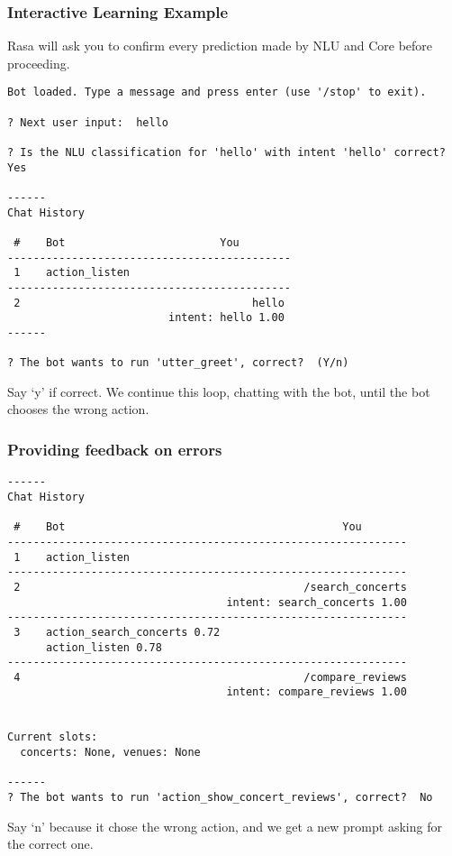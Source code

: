  \begin{frame}[fragile]\frametitle{Interactive Learning Example}
 Rasa will ask you to confirm every prediction made by NLU and Core before proceeding. 
\begin{lstlisting}
Bot loaded. Type a message and press enter (use '/stop' to exit).

? Next user input:  hello

? Is the NLU classification for 'hello' with intent 'hello' correct?  Yes

------
Chat History

 #    Bot                        You
--------------------------------------------
 1    action_listen
--------------------------------------------
 2                                    hello
                         intent: hello 1.00
------

? The bot wants to run 'utter_greet', correct?  (Y/n)
\end{lstlisting}
Say `y' if correct. We continue this loop, chatting with the bot, until the bot chooses the wrong action.
\end{frame}

 \begin{frame}[fragile]\frametitle{Providing feedback on errors}
\begin{lstlisting}
------
Chat History

 #    Bot                                           You
--------------------------------------------------------------
 1    action_listen
--------------------------------------------------------------
 2                                            /search_concerts
                                  intent: search_concerts 1.00
--------------------------------------------------------------
 3    action_search_concerts 0.72
      action_listen 0.78
--------------------------------------------------------------
 4                                            /compare_reviews
                                  intent: compare_reviews 1.00


Current slots:
  concerts: None, venues: None

------
? The bot wants to run 'action_show_concert_reviews', correct?  No
\end{lstlisting}
Say `n' because it chose the wrong action, and we get a new prompt asking for the correct one.
\end{frame}

